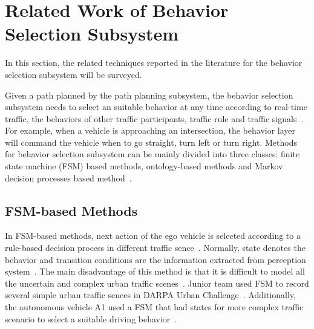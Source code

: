 \documentclass[conference]{IEEEtran}
\begin{document}
\section{Related Work of Behavior Selection Subsystem}\label{sec:behavior_selector}
In this section, the related techniques reported in the literature for the behavior selection subsystem will be surveyed.

Given a path planned by the path planning subsystem, the behavior selection subsystem needs to select an suitable behavior at any time according to real-time traffic, the behaviors of other traffic participants, traffic rule and traffic signals~\cite{Brian2016}. For example, when a vehicle is approaching an intersection, the behavior layer will command the vehicle when to go straight, turn left or turn right. Methods for behavior selection subsystem can be mainly divided into three classes: finite state machine (FSM) based methods, ontology-based methods and Markov decision processes based method~\cite{self_driving}.

\subsection{FSM-based Methods}
In FSM-based methods, next action of the ego vehicle is selected according to a rule-based decision process in different traffic sence~\cite{self_driving}. Normally, state denotes the behavior and transition conditions are the information extracted from perception system~\cite{self_driving}. The main disadvantage of this method is that it is difficult to model all the uncertain and complex urban traffic scenes~\cite{self_driving}. Junior team used FSM to record several simple urban traffic sences in DARPA Urban Challenge~\cite{buehler2009darpa}. Additionally, the autonomous vehicle A1 used a FSM that had states for more complex traffic scenario to select a suitable driving behavior~\cite{jo2015development}.
\end{document}

